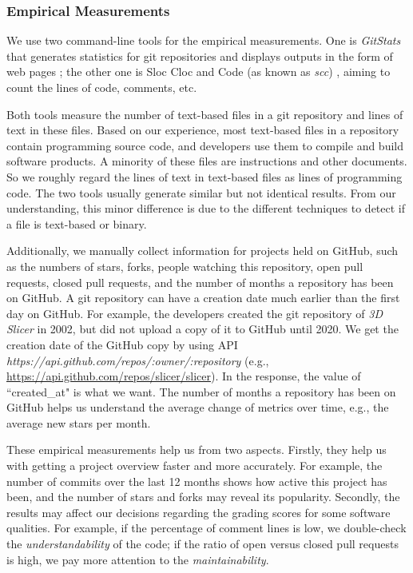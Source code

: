 \documentclass[preprint,12pt,authoryear]{elsarticle}
\begin{document}
\subsubsection{Empirical Measurements} \label{sec_empirical_measurements}

We use two command-line tools for the empirical measurements. One is
\textit{GitStats} that generates statistics for git repositories and displays
outputs in the form of web pages \citep{Gieniusz2019}; the other one is Sloc Cloc
and Code (as known as \textit{scc}) \citep{Boyter2021}, aiming to count the lines
of code, comments, etc.

Both tools measure the number of text-based files in a git repository and lines
of text in these files. Based on our experience, most text-based files in a
repository contain programming source code, and developers use them to compile
and build software products. A minority of these files are instructions and
other documents. So we roughly regard the lines of text in text-based files as
lines of programming code. The two tools usually generate similar but not
identical results. From our understanding, this minor difference is due to the
different techniques to detect if a file is text-based or binary.

Additionally, we manually collect information for projects held on GitHub, such
as the numbers of stars, forks, people watching this repository, open pull
requests, closed pull requests, and the number of months a repository has been
on GitHub. A git repository can have a creation date much earlier than the first
day on GitHub. For example, the developers created the git repository of
\textit{3D Slicer} in 2002, but did not upload a copy of it to GitHub until
2020. We get the creation date of the GitHub copy by using API
\textit{https://api.github.com/repos/{:owner}/{:repository}} (e.g.,
\hyperlink{https://api.github.com/repos/slicer/slicer}{https://api.github.com/repos/slicer/slicer}).
In the response, the value of ``created\_at" is what we want. The number of
months a repository has been on GitHub helps us understand the average change of
metrics over time, e.g., the average new stars per month. 

These empirical measurements help us from two aspects. Firstly, they help us
with getting a project overview faster and more accurately. For example, the
number of commits over the last 12 months shows how active this project has
been, and the number of stars and forks may reveal its popularity. Secondly, the
results may affect our decisions regarding the grading scores for some software
qualities. For example, if the percentage of comment lines is low, we
double-check the \textit{understandability} of the code; if the ratio of open
versus closed pull requests is high, we pay more attention to the
\textit{maintainability}.
\end{document}

